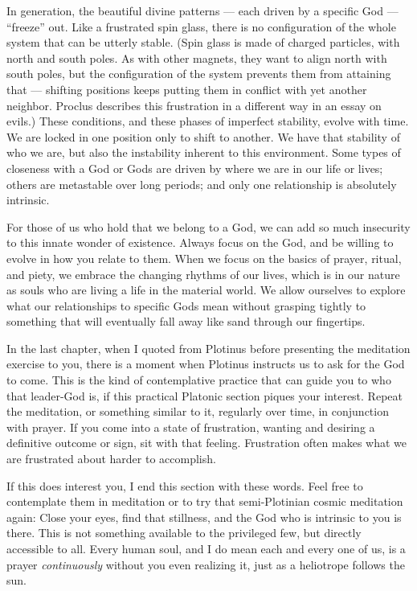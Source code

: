 \documentclass[
]{book}
\begin{document}
In generation, the beautiful divine patterns --- each driven by a specific God --- ``freeze'' out. Like a frustrated spin glass, there is no configuration of the whole system that can be utterly stable. (Spin glass is made of charged particles, with north and south poles. As with other magnets, they want to align north with south poles, but the configuration of the system prevents them from attaining that --- shifting positions keeps putting them in conflict with yet another neighbor. Proclus describes this frustration in a different way in an essay on evils.) These conditions, and these phases of imperfect stability, evolve with time. We are locked in one position only to shift to another. We have that stability of who we are, but also the instability inherent to this environment. Some types of closeness with a God or Gods are driven by where we are in our life or lives; others are metastable over long periods; and only one relationship is absolutely intrinsic.

For those of us who hold that we belong to a God, we can add so much insecurity to this innate wonder of existence. Always focus on the God, and be willing to evolve in how you relate to them. When we focus on the basics of prayer, ritual, and piety, we embrace the changing rhythms of our lives, which is in our nature as souls who are living a life in the material world. We allow ourselves to explore what our relationships to specific Gods mean without grasping tightly to something that will eventually fall away like sand through our fingertips.

In the last chapter, when I quoted from Plotinus before presenting the meditation exercise to you, there is a moment when Plotinus instructs us to ask for the God to come. This is the kind of contemplative practice that can guide you to who that leader-God is, if this practical Platonic section piques your interest. Repeat the meditation, or something similar to it, regularly over time, in conjunction with prayer. If you come into a state of frustration, wanting and desiring a definitive outcome or sign, sit with that feeling. Frustration often makes what we are frustrated about harder to accomplish.

If this does interest you, I end this section with these words. Feel free to contemplate them in meditation or to try that semi-Plotinian cosmic meditation again: Close your eyes, find that stillness, and the God who is intrinsic to you is there. This is not something available to the privileged few, but directly accessible to all. Every human soul, and I do mean each and every one of us, is a prayer \emph{continuously} without you even realizing it, just as a heliotrope follows the sun.
\end{document}
